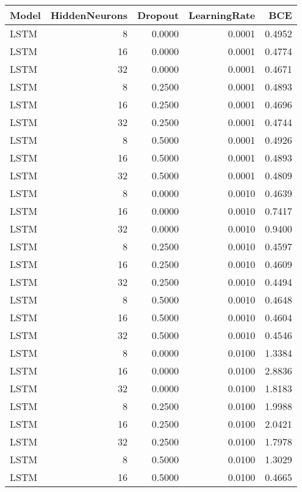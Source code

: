 \begin{table}[h!]
\centering
 \begin{adjustbox}{max width=\textwidth}
\begin{tabular}{lrrrr}
  \hline
Model & HiddenNeurons & Dropout & LearningRate & BCE \\ 
  \hline
LSTM &     8 & 0.0000 & 0.0001 & 0.4952 \\ 
  LSTM &    16 & 0.0000 & 0.0001 & 0.4774 \\ 
  LSTM &    32 & 0.0000 & 0.0001 & 0.4671 \\ 
  LSTM &     8 & 0.2500 & 0.0001 & 0.4893 \\ 
  LSTM &    16 & 0.2500 & 0.0001 & 0.4696 \\ 
  LSTM &    32 & 0.2500 & 0.0001 & 0.4744 \\ 
  LSTM &     8 & 0.5000 & 0.0001 & 0.4926 \\ 
  LSTM &    16 & 0.5000 & 0.0001 & 0.4893 \\ 
  LSTM &    32 & 0.5000 & 0.0001 & 0.4809 \\ 
  LSTM &     8 & 0.0000 & 0.0010 & 0.4639 \\ 
  LSTM &    16 & 0.0000 & 0.0010 & 0.7417 \\ 
  LSTM &    32 & 0.0000 & 0.0010 & 0.9400 \\ 
  LSTM &     8 & 0.2500 & 0.0010 & 0.4597 \\ 
  LSTM &    16 & 0.2500 & 0.0010 & 0.4609 \\ 
  LSTM &    32 & 0.2500 & 0.0010 & 0.4494 \\ 
  LSTM &     8 & 0.5000 & 0.0010 & 0.4648 \\ 
  LSTM &    16 & 0.5000 & 0.0010 & 0.4604 \\ 
  LSTM &    32 & 0.5000 & 0.0010 & 0.4546 \\ 
  LSTM &     8 & 0.0000 & 0.0100 & 1.3384 \\ 
  LSTM &    16 & 0.0000 & 0.0100 & 2.8836 \\ 
  LSTM &    32 & 0.0000 & 0.0100 & 1.8183 \\ 
  LSTM &     8 & 0.2500 & 0.0100 & 1.9988 \\ 
  LSTM &    16 & 0.2500 & 0.0100 & 2.0421 \\ 
  LSTM &    32 & 0.2500 & 0.0100 & 1.7978 \\ 
  LSTM &     8 & 0.5000 & 0.0100 & 1.3029 \\ 
  LSTM &    16 & 0.5000 & 0.0100 & 0.4665 \\ 

\end{tabular}
\end{adjustbox}
\end{table}
